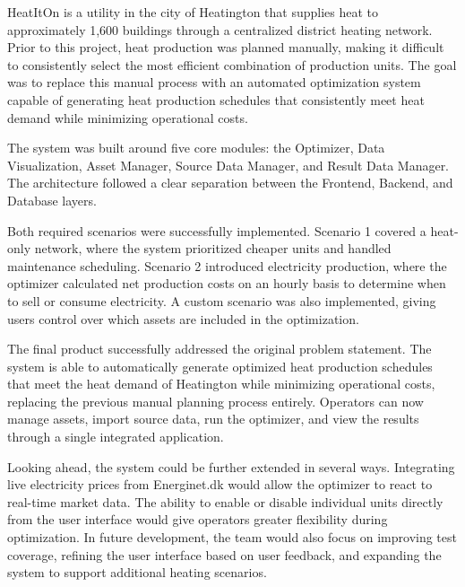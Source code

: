 \hspace*{1cm} HeatItOn is a utility in the city of Heatington that supplies heat to 
approximately 1,600 buildings through a centralized district heating network. Prior to 
this project, heat production was planned manually, making it difficult to consistently 
select the most efficient combination of production units. The goal was to replace this 
manual process with an automated optimization system capable of generating heat 
production schedules that consistently meet heat demand while minimizing operational 
costs.

\hspace*{1cm} The system was built around five core modules: the Optimizer, Data 
Visualization, Asset Manager, Source Data Manager, and Result Data Manager. The 
architecture followed a clear separation between the Frontend, Backend, and Database 
layers.

\hspace*{1cm} Both required scenarios were successfully implemented. Scenario 1 covered 
a heat-only network, where the system prioritized cheaper units and handled maintenance 
scheduling. Scenario 2 introduced electricity production, where the optimizer calculated 
net production costs on an hourly basis to determine when to sell or consume electricity. 
A custom scenario was also implemented, giving users control over which assets are 
included in the optimization.

\hspace*{1cm} The final product successfully addressed the original problem statement. 
The system is able to automatically generate optimized heat production schedules that 
meet the heat demand of Heatington while minimizing operational costs, replacing the 
previous manual planning process entirely. Operators can now manage assets, import 
source data, run the optimizer, and view the results through a single integrated 
application.

\hspace*{1cm} Looking ahead, the system could be further extended in several ways. 
Integrating live electricity prices from Energinet.dk would allow the optimizer to react 
to real-time market data. The ability to enable or disable individual units directly from 
the user interface would give operators greater flexibility during optimization. In future 
development, the team would also focus on improving test coverage, refining the user 
interface based on user feedback, and expanding the system to support additional heating 
scenarios.
